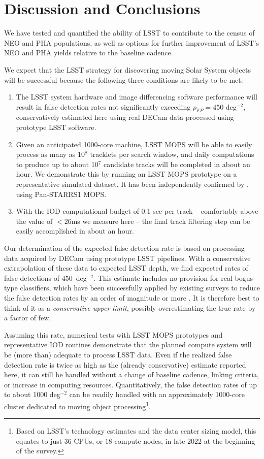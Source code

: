 

\section{Discussion and Conclusions\label{sec:discussion}}

We have tested and quantified the ability of LSST to contribute to the census of NEO and PHA populations, as well as options for further improvement of LSST's NEO and PHA yields relative to the baseline cadence.

We expect that the LSST strategy for discovering moving Solar System objects will be successful because the following three conditions are likely to be met:
\begin{enumerate}
	\item The LSST system hardware and image differencing software performance will result in false detection
	rates not significantly exceeding $\rho_{FP} =  450$ deg$^{-2}$, conservatively estimated here using real DECam data
	processed using prototype LSST software.
	\item Given an anticipated 1000-core machine, LSST MOPS will be able to easily process as many as
	10$^8$ tracklets per search window, and daily computations to produce up to about 10$^7$
	candidate tracks will be completed in about an hour. We demonstrate this by running an LSST MOPS prototype on a representative simulated dataset. It has been independently confirmed by \cite{VeresChesley2017mops}, using Pan-STARRS1 MOPS.
	\item With the IOD computational budget of 0.1 sec per track -- comfortably above the value of $<26$ms we measure here -- the final track filtering step can
	be easily accomplished in about an hour.
\end{enumerate}

Our determination of the expected false detection rate is based on processing data acquired by DECam using prototype LSST pipelines. With a conservative extrapolation of these data to expected LSST depth, we find expected rates of false detections of $450$~deg$^{-2}$. This estimate includes no provision for real-bogus type classifiers, which have been successfully applied by existing surveys to reduce the false detection rates by an order of magnitude or more \citep[e.g.][]{goldstein15}. It is therefore best to think of it as a {\it conservative upper limit}, possibly overestimating the true rate by a factor of few.

Assuming this rate, numerical tests with LSST MOPS prototypes and representative IOD routines demonstrate that the planned compute system will be (more than) adequate to
process LSST data. Even if the realized false detection rate is twice as high as
the (already conservative) estimate reported here, it can still be handled without a change of baseline cadence, linking criteria, or
increase in computing resources. Quantitatively, the false detection rates of up to about
1000 deg$^{-2}$ can be readily handled with an approximately 1000-core cluster dedicated to moving object processing\footnote{Based on LSST's technology estimates and the data center sizing model, this equates to just $36$ CPUs, or $18$ compute nodes, in late 2022 at the beginning of the survey.}.



